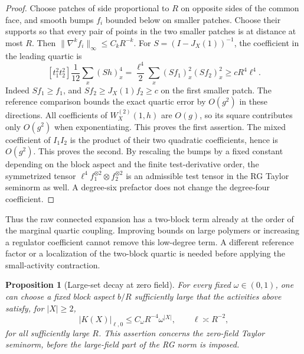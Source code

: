 \documentclass[11pt]{article}
\newtheorem{proposition}{Proposition}[section]
\begin{document}
\begin{proof}
Choose patches of side proportional to \(R\) on opposite sides
of the common face, and smooth bumps \(f_i\) bounded below on
smaller patches. Choose their supports so that every pair of
points in the two smaller patches is at distance at most \(R\).
Then \(\|\nabla^k f_i\|_\infty\le C_kR^{-k}\).
For \(S=(I-J_X(1))^{-1}\), the coefficient in the leading quartic is
\[
 [t_1^2t_2^2]\frac1{12}\sum_x(Sh)_x^4
 =\frac{\ell^4}{2}\sum_x(Sf_1)_x^2(Sf_2)_x^2\ge cR^4\ell^4.
\]
Indeed \(Sf_1\ge f_1\), and \(Sf_2\ge J_X(1)f_2\ge c\)
on the first smaller patch. The reference comparison bounds the
exact quartic error by \(O(g^2)\) in these directions. All coefficients
of \(W_X^{(2)}(1,h)\) are \(O(g)\), so its square contributes only
\(O(g^2)\) when exponentiating. This proves the first assertion.
The mixed coefficient of \(I_1I_2\) is the product of their two
quadratic coefficients, hence is \(O(g^2)\). This proves the second.
By rescaling the bumps by a fixed constant depending on the block
aspect and the finite test-derivative order, the symmetrized tensor
\(\ell^4 f_1^{\otimes2}\otimes f_2^{\otimes2}\) is an admissible
test tensor in the RG Taylor seminorm as well. A degree-six prefactor
does not change the degree-four coefficient.
\end{proof}

Thus the raw connected expansion has a two-block term already
at the order of the marginal quartic coupling. Improving bounds on
large polymers or increasing a regulator coefficient cannot remove
this low-degree term. A different reference factor or a localization
of the two-block quartic is needed before applying the small-activity
contraction.

\begin{proposition}[Large-set decay at zero field]\label{prop:forest_zero}
For every fixed \(\omega\in(0,1)\), one can choose a fixed block
aspect \(b/R\) sufficiently large that the activities above satisfy,
for \(|X|\ge2\),
\[
 |K(X)|_{\ell,0}\le C_\omega R^{-4}\omega^{|X|},
 \qquad \ell\asymp R^{-2},
\]
for all sufficiently large \(R\). This assertion concerns the
zero-field Taylor seminorm, before the large-field part of the
RG norm is imposed.
\end{proposition}
\end{document}
